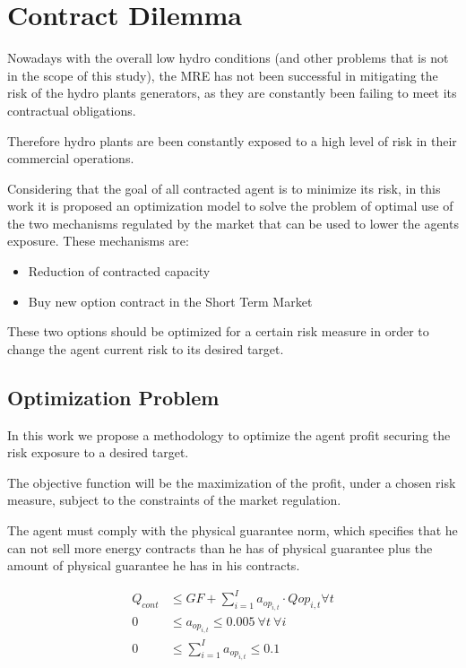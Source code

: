 \documentclass[a4paper]{IEEEtran}
\begin{document}
\section{Contract Dilemma}
Nowadays with the overall low hydro conditions (and other problems that is not in the scope of this study), the MRE has not been successful in mitigating the risk of the hydro plants generators, as they are constantly been failing to meet its contractual obligations. 

Therefore hydro plants are been constantly exposed to a high level of risk in their commercial operations.

Considering that the goal of all contracted agent is to minimize its risk, in this work it is proposed an optimization model to solve the problem of optimal use of the two mechanisms regulated by the market that can be used to lower the agents exposure. These mechanisms are:

\begin{itemize}
	\item Reduction of contracted capacity
	\item Buy new option contract in the 	Short Term Market
\end{itemize}

These two options should be optimized for a certain risk measure in order to change the agent current risk to its desired target. 

\subsection{Optimization Problem} 
In this work we propose a methodology to optimize the agent profit securing the risk exposure to a desired target.

The objective function will be the maximization of the profit, under a chosen risk measure, subject to the constraints of the market regulation.

The agent must comply with the physical guarantee norm, which specifies that he can not sell more energy contracts than he has of physical guarantee plus the amount of physical guarantee he has in his contracts.

\begin{align}
	Q_{cont} &\leq GF + \sum_{i=1}^{I} a_{op_{i,t}} \cdot Q{op_{i,t}} \forall t \\
	0 &\leq a_{op_{i,t}} \leq 0.005 \ \forall t \ \forall i \\
	0 &\leq \sum_{i=1}^{I} a_{op_{i,t}} \leq 0.1
\end{align}
\end{document}
